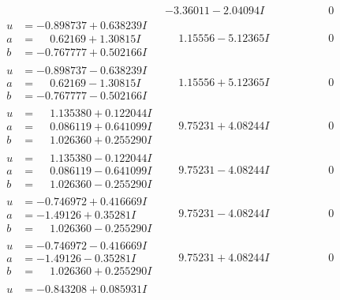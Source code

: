 \documentclass[1p]{elsarticle_modified}
\theoremstyle{definition}
\begin{document}
$$\begin{array}{c|c|c}
 & -3.36011 - 2.04094 I & \phantom{-0.000000 } 0 \\ \hline\begin{aligned}
u &= -0.898737 + 0.638239 I \\
a &= \phantom{-}0.62169 + 1.30815 I \\
b &= -0.767777 + 0.502166 I\end{aligned}
 & \phantom{-}1.15556 - 5.12365 I & \phantom{-0.000000 } 0 \\ \hline\begin{aligned}
u &= -0.898737 - 0.638239 I \\
a &= \phantom{-}0.62169 - 1.30815 I \\
b &= -0.767777 - 0.502166 I\end{aligned}
 & \phantom{-}1.15556 + 5.12365 I & \phantom{-0.000000 } 0 \\ \hline\begin{aligned}
u &= \phantom{-}1.135380 + 0.122044 I \\
a &= \phantom{-}0.086119 + 0.641099 I \\
b &= \phantom{-}1.026360 + 0.255290 I\end{aligned}
 & \phantom{-}9.75231 + 4.08244 I & \phantom{-0.000000 } 0 \\ \hline\begin{aligned}
u &= \phantom{-}1.135380 - 0.122044 I \\
a &= \phantom{-}0.086119 - 0.641099 I \\
b &= \phantom{-}1.026360 - 0.255290 I\end{aligned}
 & \phantom{-}9.75231 - 4.08244 I & \phantom{-0.000000 } 0 \\ \hline\begin{aligned}
u &= -0.746972 + 0.416669 I \\
a &= -1.49126 + 0.35281 I \\
b &= \phantom{-}1.026360 - 0.255290 I\end{aligned}
 & \phantom{-}9.75231 - 4.08244 I & \phantom{-0.000000 } 0 \\ \hline\begin{aligned}
u &= -0.746972 - 0.416669 I \\
a &= -1.49126 - 0.35281 I \\
b &= \phantom{-}1.026360 + 0.255290 I\end{aligned}
 & \phantom{-}9.75231 + 4.08244 I & \phantom{-0.000000 } 0 \\ \hline\begin{aligned}
u &= -0.843208 + 0.085931 I \\

\end{aligned}
\end{array}$$
\end{document}
